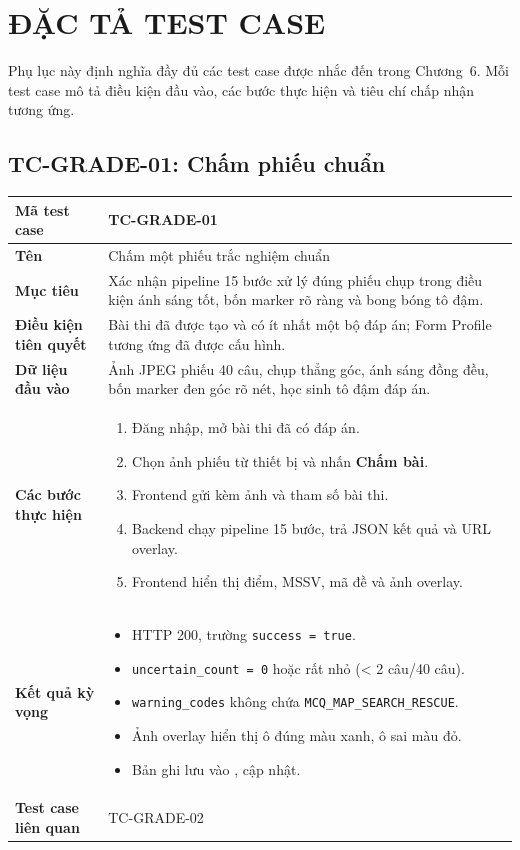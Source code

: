 \chapter{ĐẶC TẢ TEST CASE}
\label{app:test-cases}

Phụ lục này định nghĩa đầy đủ các test case được nhắc đến trong Chương~6. Mỗi test case mô tả điều kiện đầu vào, các bước thực hiện và tiêu chí chấp nhận tương ứng.

\renewcommand{\arraystretch}{1.3}

\section*{TC-GRADE-01: Chấm phiếu chuẩn}

\begin{longtable}{|L{3.5cm}|L{10.5cm}|}
\hline
\textbf{Mã test case} & TC-GRADE-01 \\
\hline
\textbf{Tên} & Chấm một phiếu trắc nghiệm chuẩn \\
\hline
\textbf{Mục tiêu} & Xác nhận pipeline 15 bước xử lý đúng phiếu chụp trong điều kiện ánh sáng tốt, bốn marker rõ ràng và bong bóng tô đậm. \\
\hline
\textbf{Điều kiện tiên quyết} & Bài thi đã được tạo và có ít nhất một bộ đáp án; Form Profile tương ứng đã được cấu hình. \\
\hline
\textbf{Dữ liệu đầu vào} & Ảnh JPEG phiếu 40 câu, chụp thẳng góc, ánh sáng đồng đều, bốn marker đen góc rõ nét, học sinh tô đậm đáp án. \\
\hline
\textbf{Các bước thực hiện} &
\begin{enumerate}[leftmargin=1em]
  \item Đăng nhập, mở bài thi đã có đáp án.
  \item Chọn ảnh phiếu từ thiết bị và nhấn \textbf{Chấm bài}.
  \item Frontend gửi  kèm ảnh và tham số bài thi.
  \item Backend chạy pipeline 15 bước, trả JSON kết quả và URL overlay.
  \item Frontend hiển thị điểm, MSSV, mã đề và ảnh overlay.
\end{enumerate} \\
\hline
\textbf{Kết quả kỳ vọng} &
\begin{itemize}[leftmargin=1em]
  \item HTTP 200, trường \texttt{success = true}.
  \item \texttt{uncertain\_count = 0} hoặc rất nhỏ (< 2 câu/40 câu).
  \item \texttt{warning\_codes} không chứa \texttt{MCQ\_MAP\_SEARCH\_RESCUE}.
  \item Ảnh overlay hiển thị ô đúng màu xanh, ô sai màu đỏ.
  \item Bản ghi lưu vào ,  cập nhật.
\end{itemize} \\
\hline
\textbf{Test case liên quan} & TC-GRADE-02 \\
\hline
\end{longtable}

